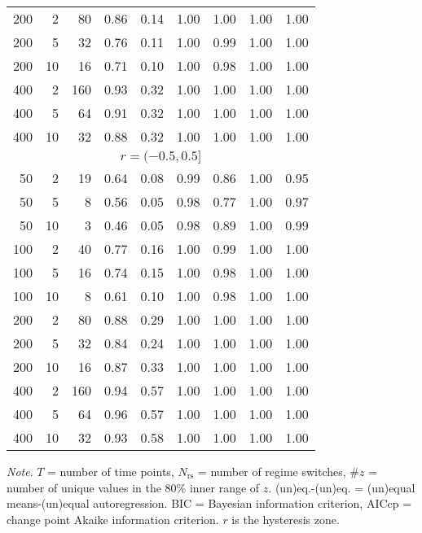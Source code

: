 \begin{table}
\begin{tabular}{rrr cc cc cc}
  200 & 2  & 80  & 0.86 & 0.14 & 1.00 & 1.00 & 1.00 & 1.00 \\ 
  200 & 5  & 32  & 0.76 & 0.11 & 1.00 & 0.99 & 1.00 & 1.00 \\ 
  200 & 10 & 16  & 0.71 & 0.10 & 1.00 & 0.98 & 1.00 & 1.00 \\ 
  400 & 2  & 160 & 0.93 & 0.32 & 1.00 & 1.00 & 1.00 & 1.00 \\ 
  400 & 5  & 64  & 0.91 & 0.32 & 1.00 & 1.00 & 1.00 & 1.00 \\ 
  400 & 10 & 32  & 0.88 & 0.32 & 1.00 & 1.00 & 1.00 & 1.00 \\ 
  \hline
  \multicolumn{9}{c}{$r = (-0.5, 0.5]$ } \\
  50  & 2  & 19  & 0.64 & 0.08 & 0.99 & 0.86 & 1.00 & 0.95 \\ 
  50  & 5  & 8   & 0.56 & 0.05 & 0.98 & 0.77 & 1.00 & 0.97 \\ 
  50  & 10 & 3   & 0.46 & 0.05 & 0.98 & 0.89 & 1.00 & 0.99 \\
  100 & 2  & 40  & 0.77 & 0.16 & 1.00 & 0.99 & 1.00 & 1.00 \\ 
  100 & 5  & 16  & 0.74 & 0.15 & 1.00 & 0.98 & 1.00 & 1.00 \\ 
  100 & 10 & 8   & 0.61 & 0.10 & 1.00 & 0.98 & 1.00 & 1.00 \\ 
  200 & 2  & 80  & 0.88 & 0.29 & 1.00 & 1.00 & 1.00 & 1.00 \\ 
  200 & 5  & 32  & 0.84 & 0.24 & 1.00 & 1.00 & 1.00 & 1.00 \\ 
  200 & 10 & 16  & 0.87 & 0.33 & 1.00 & 1.00 & 1.00 & 1.00 \\ 
  400 & 2  & 160 & 0.94 & 0.57 & 1.00 & 1.00 & 1.00 & 1.00 \\ 
  400 & 5  & 64  & 0.96 & 0.57 & 1.00 & 1.00 & 1.00 & 1.00 \\ 
  400 & 10 & 32  & 0.93 & 0.58 & 1.00 & 1.00 & 1.00 & 1.00 \\ 
   \hline
\end{tabular}
\newline
\small\textit{Note}.
$T$ = number of time points,
$N_{\mathrm{rs}}$ = number of regime switches,
\#$z$ = number of unique values in the 80\% inner range of $z$.
(un)eq.-(un)eq. = (un)equal means-(un)equal autoregression.
BIC = Bayesian information criterion, AICcp = change point Akaike information criterion.
$r$ is the hysteresis zone.
\label{tab:model_selection_results}
\end{table}

